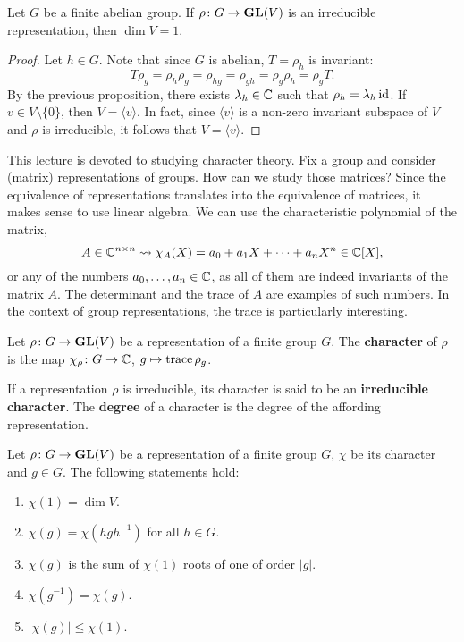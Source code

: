\begin{proposition}
    Let $G$ be a finite abelian group. 
    If $\rho\colon G\to\mathbf{GL}(V)$ is an irreducible representation, then
    $\dim V=1$. 
\end{proposition}

\begin{proof}
    Let $h\in G$. Note that since $G$ is abelian, $T=\rho_h$ is invariant:
    \[
    T\rho_g=\rho_h\rho_g=\rho_{hg}=\rho_{gh}=\rho_g\rho_h=\rho_gT.
    \]
    By the previous proposition, 
    there exists $\lambda_h\in\mathbb{C}$ such that $\rho_h=\lambda_h\operatorname{id}$. If $v\in V\setminus\{0\}$, 
    then $V=\langle v\rangle$. In fact, since 
    $\langle v\rangle$ is a non-zero invariant subspace of $V$ and $\rho$ is irreducible, 
    it follows that $V=\langle v\rangle$. 
\end{proof}


This lecture is devoted to studying character theory. Fix a group and consider
(matrix) representations of groups. How can we study those matrices? Since 
the equivalence of representations translates into the equivalence of matrices, 
it makes sense to use linear algebra. We can use 
the characteristic polynomial of the matrix, 
\[
A\in\mathbb{C}^{n\times n}\rightsquigarrow \chi_A(X)=a_0+a_1X+\cdots+a_nX^n\in \mathbb{C}[X], 
\]
or any of the numbers $a_0,\dots,a_n\in\mathbb{C}$, as all of them are indeed invariants of the matrix $A$.
The determinant and the trace of $A$ are examples of such numbers. In the context of group representations,  
the trace is particularly interesting. 

\begin{definition}
	Let $\rho\colon G\to\mathbf{GL}(V)$ be a representation of a finite group $G$. The \textbf{character} of $\rho$ 
	is the map $\chi_\rho\colon G\to\mathbb{C}$, $g\mapsto\operatorname{trace}\rho_g$. 	
\end{definition}

If a representation $\rho$ is irreducible, its character is said to be an 
\textbf{irreducible character}. The \textbf{degree} of a character is the degree of the affording
representation. 

\begin{proposition}
	Let $\rho\colon G\to\mathbf{GL}(V)$ be a representation of a finite group $G$, $\chi$ be its character and $g\in G$.
	The following statements hold:
	\begin{enumerate}
		\item $\chi(1)=\dim V$. 
		\item $\chi(g)=\chi(hgh^{-1})$ for all $h\in G$.
		\item $\chi(g)$ is the sum of $\chi(1)$ roots of one of order $|g|$. 
		\item $\chi(g^{-1})=\overline{\chi(g)}$. 
		\item $|\chi(g)|\leq\chi(1)$.  
	\end{enumerate} 
\end{proposition}


